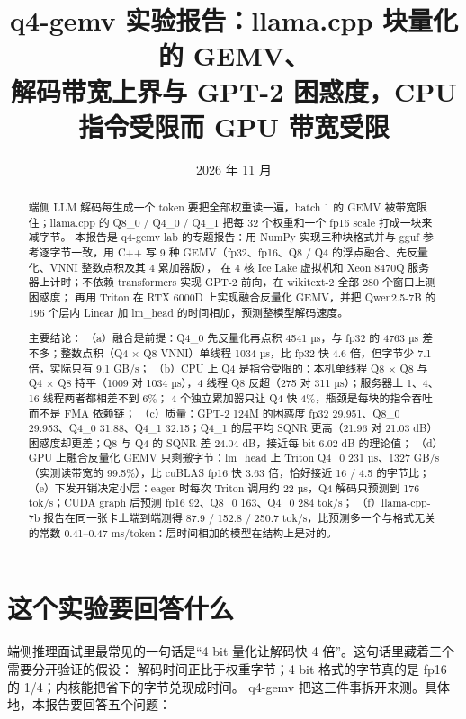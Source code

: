 \documentclass[11pt,a4paper]{ctexart}
\title{q4-gemv 实验报告：llama.cpp 块量化的 GEMV、\\解码带宽上界与 GPT-2 困惑度，CPU 指令受限而 GPU 带宽受限}
\author{\authorline}
\date{2026 年 11 月}
\begin{document}
\maketitle

\begin{abstract}
端侧 LLM 解码每生成一个 token 要把全部权重读一遍，batch 1 的 GEMV 被带宽限住；llama.cpp 的 Q8\_0 / Q4\_0 / Q4\_1 把每 32 个权重和一个 fp16 scale 打成一块来减字节。
本报告是 q4-gemv lab 的专题报告：用 NumPy 实现三种块格式并与 gguf 参考逐字节一致，用 C++ 写 9 种 GEMV（fp32、fp16、Q8 / Q4 的浮点融合、先反量化、VNNI 整数点积及其 4 累加器版），
在 4 核 Ice Lake 虚拟机和 Xeon 8470Q 服务器上计时；不依赖 transformers 实现 GPT-2 前向，在 wikitext-2 全部 280 个窗口上测困惑度；
再用 Triton 在 RTX 6000D 上实现融合反量化 GEMV，并把 Qwen2.5-7B 的 196 个层内 Linear 加 lm\_head 的时间相加，预测整模型解码速度。

主要结论：
（a）融合是前提：Q4\_0 先反量化再点积 4541 µs，与 fp32 的 4763 µs 差不多；整数点积（Q4 × Q8 VNNI）单线程 1034 µs，比 fp32 快 4.6 倍，但字节少 7.1 倍，实际只有 9.1 GB/s；
（b）CPU 上 Q4 是指令受限的：本机单线程 Q8 × Q8 与 Q4 × Q8 持平（1009 对 1034 µs），4 线程 Q8 反超（275 对 311 µs）；服务器上 1、4、16 线程两者都相差不到 6\%；
4 个独立累加器只让 Q4 快 4\%，瓶颈是每块的指令吞吐而不是 FMA 依赖链；
（c）质量：GPT-2 124M 的困惑度 fp32 29.951、Q8\_0 29.953、Q4\_0 31.88、Q4\_1 32.15；Q4\_1 的层平均 SQNR 更高（21.96 对 21.03 dB）困惑度却更差；Q8 与 Q4 的 SQNR 差 24.04 dB，接近每 bit 6.02 dB 的理论值；
（d）GPU 上融合反量化 GEMV 只剩搬字节：lm\_head 上 Triton Q4\_0 231 µs、1327 GB/s（实测读带宽的 99.5\%），比 cuBLAS fp16 快 3.63 倍，恰好接近 16 / 4.5 的字节比；
（e）下发开销决定小层：eager 时每次 Triton 调用约 22 µs，Q4 解码只预测到 176 tok/s；CUDA graph 后预测 fp16 92、Q8\_0 163、Q4\_0 284 tok/s；
（f）llama-cpp-7b 报告在同一张卡上端到端测得 87.9 / 152.8 / 250.7 tok/s，比预测多一个与格式无关的常数 0.41--0.47 ms/token：层时间相加的模型在结构上是对的。
\end{abstract}

\tableofcontents
\newpage

\section{这个实验要回答什么}\label{sec:questions}

端侧推理面试里最常见的一句话是“4 bit 量化让解码快 4 倍”。这句话里藏着三个需要分开验证的假设：
解码时间正比于权重字节；4 bit 格式的字节真的是 fp16 的 1/4；内核能把省下的字节兑现成时间。
q4-gemv 把这三件事拆开来测。具体地，本报告要回答五个问题：
\end{document}
